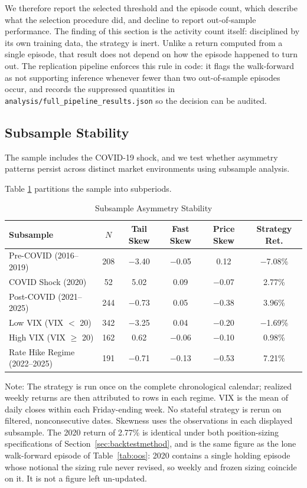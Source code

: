 \documentclass[11pt]{article}
\begin{document}
We therefore report the selected threshold and the episode count, which describe what the selection procedure did, and decline to report out-of-sample performance. The finding of this section is the activity count itself: disciplined by its own training data, the strategy is inert. Unlike a return computed from a single episode, that result does not depend on how the episode happened to turn out. The replication pipeline enforces this rule in code: it flags the walk-forward as not supporting inference whenever fewer than two out-of-sample episodes occur, and records the suppressed quantities in \texttt{analysis/full\_pipeline\_results.json} so the decision can be audited.

\subsection{Subsample Stability}

The sample includes the COVID-19 shock, and we test whether asymmetry patterns persist across distinct market environments using subsample analysis.

Table \ref{tab:subsample} partitions the sample into subperiods.

\begin{table}[H]
\centering
\caption{Subsample Asymmetry Stability}
\label{tab:subsample}
\small
\begin{tabular}{@{}lccccc@{}}
\toprule
Subsample & $N$ & Tail Skew & Fast Skew & Price Skew & Strategy Ret. \\
\midrule
Pre-COVID (2016--2019) & 208 & $-$3.40 & $-$0.05 & 0.12 & $-$7.08\% \\
COVID Shock (2020) & 52 & 5.02 & 0.09 & $-$0.07 & 2.77\% \\
Post-COVID (2021--2025) & 244 & $-$0.73 & 0.05 & $-$0.38 & 3.96\% \\
Low VIX (VIX $<$ 20) & 342 & $-$3.25 & 0.04 & $-$0.20 & $-$1.69\% \\
High VIX (VIX $\geq$ 20) & 162 & 0.62 & $-$0.06 & $-$0.10 & 0.98\% \\
Rate Hike Regime (2022--2025) & 191 & $-$0.71 & $-$0.13 & $-$0.53 & 7.21\% \\
\bottomrule
\end{tabular}
\par\vspace{0.3em}
\parbox{\linewidth}{\footnotesize Note: The strategy is run once on the complete chronological calendar; realized weekly returns are then attributed to rows in each regime. VIX is the mean of daily closes within each Friday-ending week. No stateful strategy is rerun on filtered, nonconsecutive dates. Skewness uses the observations in each displayed subsample. The 2020 return of 2.77\% is identical under both position-sizing specifications of Section~\ref{sec:backtestmethod}, and is the same figure as the lone walk-forward episode of Table~\ref{tab:oos}: 2020 contains a single holding episode whose notional the sizing rule never revised, so weekly and frozen sizing coincide on it. It is not a figure left un-updated.}
\end{table}
\end{document}

